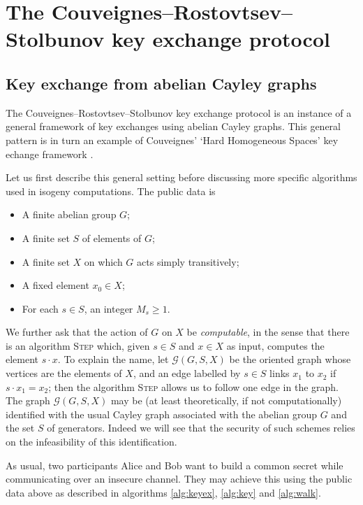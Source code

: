 \documentclass{article}
\newcommand{\Graph}{\mathcal{G}}
\newcommand{\algstyle}[1]{\textsc{#1}}
\theoremstyle{definition}
\begin{document}
\section{The Couveignes--Rostovtsev--Stolbunov key exchange protocol}
\label{sec:keyex}

\subsection{Key exchange from abelian Cayley graphs}

The Couveignes--Rostovtsev--Stolbunov key exchange protocol \cite{}
is an instance of a general
framework of key exchanges using abelian Cayley graphs. This general pattern
is in turn an example of Couveignes' `Hard Homogeneous Spaces' key echange
framework \cite{}.

Let us first describe this general
setting before discussing more specific algorithms used in isogeny computations.
The public data is
\begin{itemize}
\item A finite abelian group $G$;
\item A finite set $S$ of elements of $G$;
\item A finite set $X$ on which $G$ acts simply transitively;
\item A fixed element $x_0\in X$;
\item For each $s\in S$, an integer $M_s\geq 1$.
\end{itemize}
We further ask that the action of $G$ on $X$ be \emph{computable}, in the sense
 that there is an algorithm \algstyle{Step} which, given $s\in S$ and $x\in X$ as
input, computes the element $s\cdot x$. To explain the name, let $\Graph(G, S, X)$
be the oriented graph whose vertices are the elements of $X$, and an edge labelled
by $s\in S$ links $x_1$ to $x_2$ if $s\cdot x_1 = x_2$; then the algorithm
\algstyle{Step} allows us to follow one edge in the graph. The graph $\Graph(G, S, X)$
may be (at least theoretically, if not computationally) identified with the usual
Cayley graph associated with the abelian group $G$ and the set $S$ of generators.
Indeed we will see that the security of such schemes relies on the infeasibility
of this identification.

As usual, two participants Alice and Bob want to build a common secret while
communicating over an insecure channel. They may
achieve this using the public data above as
described in algorithms \ref{alg:keyex}, \ref{alg:key} and \ref{alg:walk}.
\end{document}
